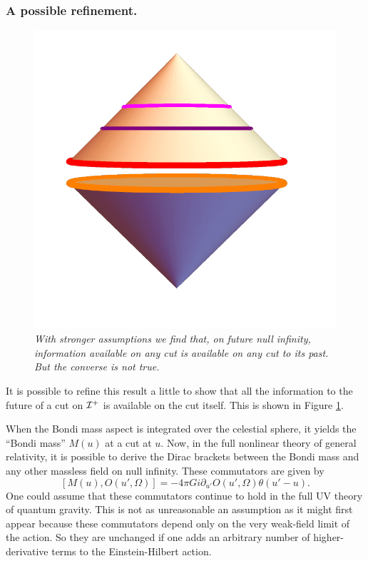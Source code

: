 \documentclass[12pt]{article}
\def\gnewt{G}
\newcommand{\be}{\begin{equation}}
\newcommand{\ee}{\end{equation}}
\def \sph{{\Omega}}
\def \scrip{{\cal I}^{+}}
\begin{document}
\subsubsection*{A possible refinement. }
\begin{figure}[!ht]
\begin{center}
\includegraphics[height=0.5\textheight]{bdrynullwithcuts.pdf}
\caption{\em With stronger assumptions we find that, on future null infinity, information available on any cut is available on any cut to its past. But the converse is not true. \label{cutinfo}}
\end{center}
\end{figure}
It is possible to refine this result a little to show that all the information to the future of a cut on $\scrip$ is available on the cut itself. This is shown in Figure \ref{cutinfo}.

 When the Bondi mass aspect is integrated over the celestial sphere, it yields the ``Bondi mass'' $M(u)$ at a cut at $u$. Now, in the full nonlinear theory of general relativity, it is possible to derive the Dirac brackets between the Bondi mass and any other massless field on null infinity. These commutators are given by
\be
\label{commgr}
[M(u), O(u', \sph)] = -4 \pi \gnewt i  \partial_{u'} O(u', \sph) \theta(u' - u).
\ee
One could assume that these commutators continue to hold in the full UV theory of quantum gravity. This is not as unreasonable an assumption as it might first appear because these commutators depend only on the very weak-field limit of the action. So they are unchanged if one adds an arbitrary number of higher-derivative terms to the Einstein-Hilbert action.
\end{document}
